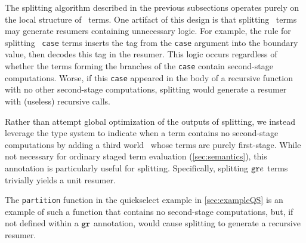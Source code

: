 \begin{abstrsyn}
The splitting algorithm described in the previous subsections operates
purely on the local structure of \lang\ terms.  One artifact of this design
is that splitting \bbonem\ terms may generate resumers containing
unnecessary logic.  For example, the rule for splitting
\bbonem\ \texttt{case} terms inserts the tag from the \texttt{case}
argument into the boundary value, then decodes this tag in the
resumer. This logic occurs regardless of whether the terms forming the
branches of the \texttt{case} contain second-stage computations.
Worse, if this \texttt{case} appeared in the body of a recursive
function with no other second-stage computations, splitting would
generate a resumer with (useless) recursive calls.

Rather than attempt global optimization of the outputs of splitting,
we instead leverage the type system to indicate when a term contains
no second-stage computations by adding a third world \bbonep\ whose
terms are purely first-stage.  While not necessary for ordinary staged
term evaluation (\ref{sec:semantics}), this annotation is
particularly useful for splitting. Specifically, splitting ${\tt gr} e$
terms trivially yields a unit resumer.

The \texttt{partition} function in the quickselect example in
\ref{sec:exampleQS} is an example of such a function that contains no
second-stage computations, but, if not defined within a ${\tt gr}$
annotation, would cause splitting to generate a recursive resumer.

\end{abstrsyn}


